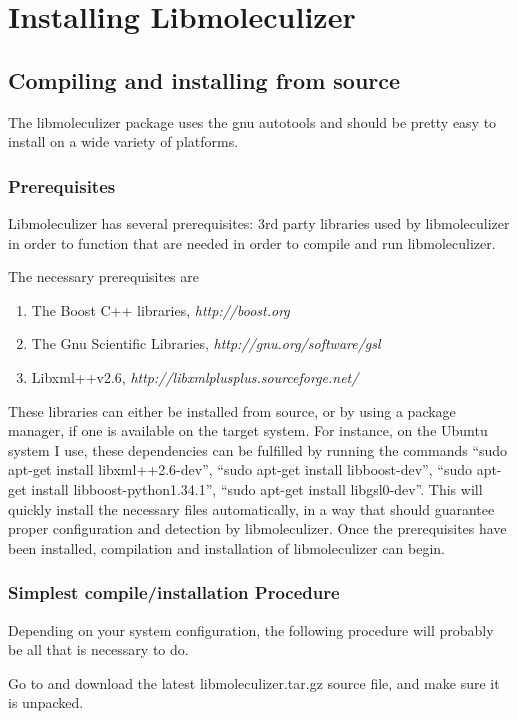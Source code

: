 \chapter{Installing Libmoleculizer}
\label{chap:installingChapter}

\section{Compiling and installing from source}
The libmoleculizer package uses the gnu autotools and should be
pretty easy to install on a wide variety of platforms. 

\subsection{Prerequisites}
Libmoleculizer has several prerequisites: 3rd party libraries used by
libmoleculizer in order to function that are needed in order to
compile and run libmoleculizer.

The necessary prerequisites are
\begin{enumerate}
\item The Boost C++ libraries, 
  \emph{http://boost.org}
\item The Gnu Scientific Libraries, 
  \emph{http://gnu.org/software/gsl}
\item Libxml++v2.6, 
  \emph{http://libxmlplusplus.sourceforge.net/}
\end{enumerate}

These libraries can either be installed from source, or by using a
package manager, if one is available on the target system.  For
instance, on the Ubuntu system I use, these dependencies can be
fulfilled by running the commands ``sudo apt-get install
libxml++2.6-dev'', ``sudo apt-get install libboost-dev'', ``sudo apt-get
install libboost-python1.34.1'', ``sudo apt-get install
libgsl0-dev''.  This will quickly install the necessary files
automatically, in a way that should guarantee proper configuration and
detection by libmoleculizer.  Once the prerequisites have been
installed, compilation and installation of libmoleculizer can begin.

\subsection{Simplest compile/installation Procedure}
Depending on your system configuration, the following procedure will
probably be all that is necessary to do.

Go to \libmzrwebsite and download the latest
  libmoleculizer.tar.gz source file, and make sure it is unpacked.  

